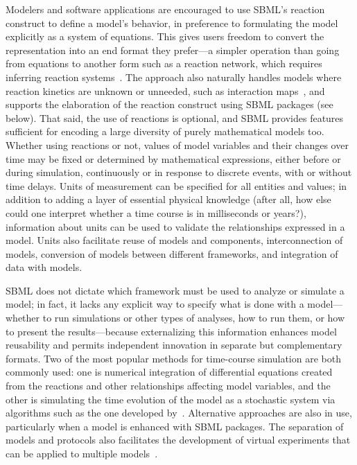 \documentclass{sbml-paper}
\begin{document}
Modelers and software applications are encouraged to use SBML's reaction construct to define a model's behavior, in preference to formulating the model explicitly as a system of equations.  This gives users freedom to convert the representation into an end format they prefer---a simpler operation than going from equations to another form such as a reaction network, which requires inferring reaction systems~\citep{Fages2015inferring}.  The approach also naturally handles models where reaction kinetics are unknown or unneeded, such as interaction maps~\citep[e.g.,][]{thiele2013community}, and supports the elaboration of the reaction construct using SBML packages (see below).  That said, the use of reactions is optional, and SBML provides features sufficient for encoding a large diversity of purely mathematical models too.  Whether using reactions or not, values of model variables and their changes over time may be fixed or determined by mathematical expressions, either before or during simulation, continuously or in response to discrete events, with or without time delays.  Units of measurement can be specified for all entities and values; in addition to adding a layer of essential physical knowledge (after all, how else could one interpret whether a time course is in milliseconds or years?), information about units can be used to validate the relationships expressed in a model.  Units also facilitate reuse of models and components, interconnection of models, conversion of models between different frameworks, and integration of data with models.

SBML does not dictate which framework must be used to analyze or simulate a model; in fact, it lacks any explicit way to specify what is done with a model---whether to run simulations or other types of analyses, how to run them, or how to present the results---because externalizing this information enhances model reusability and permits independent innovation in separate but complementary formats.  Two of the most popular methods for time-course simulation are both commonly used: one is numerical integration of differential equations created from the reactions and other relationships affecting model variables, and the other is simulating the time evolution of the model as a stochastic system via algorithms such as the one developed by~\cite{gillespie1977exact}.  Alternative approaches are also in use, particularly when a model is enhanced with SBML packages.  The separation of models and protocols also facilitates the development of virtual experiments that can be applied to multiple models~\citep{Cooper2015call}.
\end{document}
